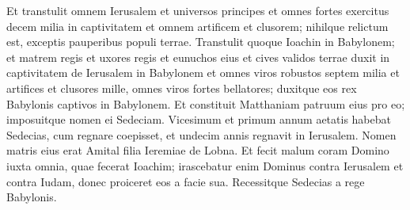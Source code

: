 \begin{biblechapter}
\begin{biblechapter}
\begin{biblechapter}
\begin{biblechapter}
\begin{biblechapter}
\begin{biblechapter}
\begin{biblechapter}
\begin{biblechapter}
\begin{biblechapter}
\begin{biblechapter}
\begin{biblechapter}
\begin{biblechapter}
\begin{biblechapter}
\begin{biblechapter}
\begin{biblechapter}
\begin{biblechapter}
\begin{biblechapter}
\begin{biblechapter}
\begin{biblechapter}
\begin{biblechapter}
\begin{biblechapter}
\begin{biblechapter}
\begin{biblechapter}
\begin{biblechapter}
\verse Et transtulit omnem Ierusalem et universos principes et omnes fortes exercitus decem milia in captivitatem et omnem artificem et clusorem; nihilque relictum est, exceptis pauperibus populi terrae. 
\verse Transtulit quoque Ioachin in Babylonem; et matrem regis et uxores regis et eunuchos eius et cives validos terrae duxit in captivitatem de Ierusalem in Babylonem 
\verse et omnes viros robustos septem milia et artifices et clusores mille, omnes viros fortes bellatores; duxitque eos rex Babylonis captivos in Babylonem.
 \verse Et constituit Matthaniam patruum eius pro eo; imposuitque nomen ei Sedeciam.
 \verse Vicesimum et primum annum aetatis habebat Sedecias, cum regnare coepisset, et undecim annis regnavit in Ierusalem. Nomen matris eius erat Amital filia Ieremiae de Lobna. 
\verse Et fecit malum coram Domino iuxta omnia, quae fecerat Ioachim; 
\verse irascebatur enim Dominus contra Ierusalem et contra Iudam, donec proiceret eos a facie sua.
 Recessitque Sedecias a rege Babylonis.
 

\end{biblechapter}
\end{biblechapter}
\end{biblechapter}
\end{biblechapter}
\end{biblechapter}
\end{biblechapter}
\end{biblechapter}
\end{biblechapter}
\end{biblechapter}
\end{biblechapter}
\end{biblechapter}
\end{biblechapter}
\end{biblechapter}
\end{biblechapter}
\end{biblechapter}
\end{biblechapter}
\end{biblechapter}
\end{biblechapter}
\end{biblechapter}
\end{biblechapter}
\end{biblechapter}
\end{biblechapter}
\end{biblechapter}
\end{biblechapter}
